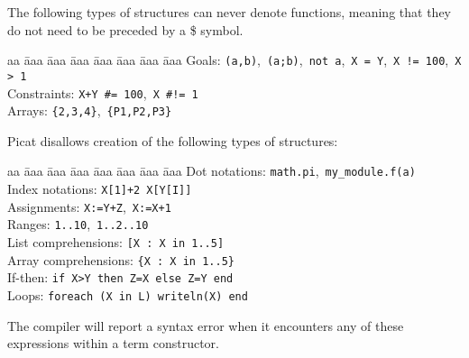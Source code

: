 The following types of structures can never denote functions, meaning that they do not need to be preceded by a \$ symbol.
\begin{tabbing}
aa \= aaa \= aaa \= aaa \=aaa \= aaa \= aaa \= aaa \kill
\> Goals:  \>  \> \> \> \> \> \texttt{(a,b)},\ \texttt{(a;b)},\ \texttt{not a},\ \texttt{X = Y},\ \verb-X != 100-,\ \verb+X > 1+ \\
\> Constraints:  \>  \> \> \> \> \> \verb-X+Y #= 100-,\ \verb+X #!= 1+ \\
\> Arrays:  \>  \> \> \> \> \> \verb+{2,3,4}+,\ \verb+{P1,P2,P3}+ \\
\end{tabbing}
Picat disallows creation of the following types of structures:
\begin{tabbing}
aa \= aaa \= aaa \= aaa \= aaa \= aaa \= aaa \= aaa \kill
\> Dot notations:  \>  \> \> \> \> \> \texttt{math.pi},\ \texttt{my\_module.f(a)} \\
\> Index notations:  \>  \> \> \> \> \> \texttt{X[1]+2}\, \texttt{X[Y[I]]} \\
\> Assignments:  \>  \> \> \> \> \> \texttt{X:=Y+Z},\ \texttt{X:=X+1} \\
\> Ranges:  \>  \> \> \> \> \> \texttt{1..10},\ \texttt{1..2..10} \\
\> List comprehensions:  \>  \> \> \> \> \> \texttt{[X : X in 1..5]} \\
\> Array comprehensions:  \>  \> \> \> \> \> \texttt{\{X : X in 1..5\}} \\
\> If-then:  \>  \> \> \> \> \> \texttt{if X>Y then Z=X else Z=Y end} \\
\> Loops:  \>  \> \> \> \> \> \texttt{foreach (X in L) writeln(X) end } 
\end{tabbing}
The compiler will report a syntax error when it encounters any of these expressions within a term constructor.

